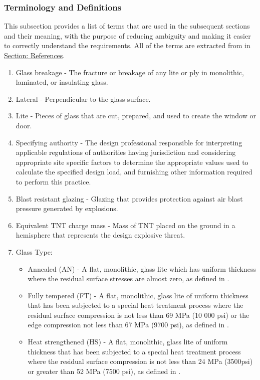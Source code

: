\documentclass[12pt]{article}
\begin{document}
\subsubsection{Terminology and Definitions}
\label{Sec:TermDefs}
This subsection provides a list of terms that are used in the subsequent sections and their meaning, with the purpose of reducing ambiguity and making it easier to correctly understand the requirements. All of the terms are extracted from \cite{astm2009} in \hyperref[Sec:References]{Section: References}.
\begin{enumerate}
\item{Glass breakage - The fracture or breakage of any lite or ply in monolithic, laminated, or insulating glass.}
\item{Lateral - Perpendicular to the glass surface.}
\item{Lite - Pieces of glass that are cut, prepared, and used to create the window or door.}
\item{Specifying authority - The design professional responsible for interpreting applicable regulations of authorities having jurisdiction and considering appropriate site specific factors to determine the appropriate values used to calculate the specified design load, and furnishing other information required to perform this practice.}
\item{Blast resistant glazing - Glazing that provides protection against air blast pressure generated by explosions.}
\item{Equivalent TNT charge mass - Mass of TNT placed on the ground in a hemisphere that represents the design explosive threat.}
\item{Glass Type:}
\begin{itemize}
\item{Annealed (AN) - A flat, monolithic, glass lite which has uniform thickness where the residual surface stresses are almost zero, as defined in \cite{astm2016}.}
\item{Fully tempered (FT) - A flat, monolithic, glass lite of uniform thickness that has been subjected to a special heat treatment process where the residual surface compression is not less than 69 MPa (10 000 psi) or the edge compression not less than 67 MPa (9700 psi), as defined in \cite{astm2012}.}
\item{Heat strengthened (HS) - A flat, monolithic, glass lite of uniform thickness that has been subjected to a special heat treatment process where the residual surface compression is not less than 24 MPa (3500psi) or greater than 52 MPa (7500 psi), as defined in \cite{astm2012}.}

\end{itemize}
\end{enumerate}
\end{document}
